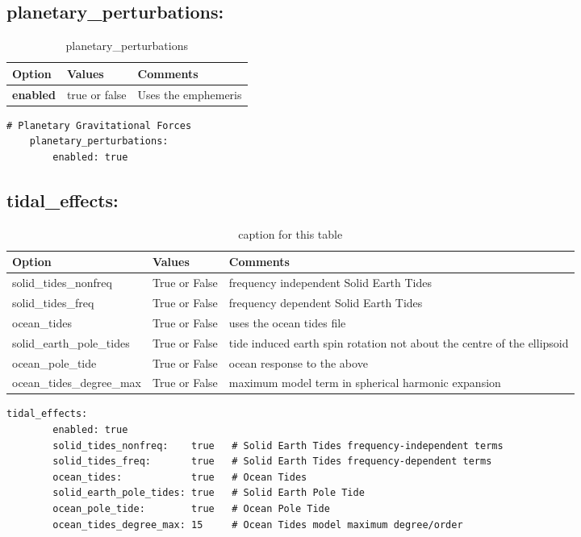 \subsection{planetary\_perturbations:}
\begin{table}[h!]
	\begin{tabular}{|p{4.5cm}|p{2cm}|p{3.5cm}|}
		\hline
		Option & Values & Comments \\
		\hline
		\textbf{enabled} & true or false & Uses the emphemeris \\ %
		\hline
	\end{tabular}
	\caption{planetary\_perturbations}
	\label{table:label_name}
\end{table}  
%
{\small
	\begin{lstlisting}[language=xml,caption=yaml example for planetary pertubations]
# Planetary Gravitational Forces
	planetary_perturbations:
		enabled: true	
	\end{lstlisting}
}	
\subsection{tidal\_effects:}
\begin{table}[h!]
	\begin{tabular}{|p{4.5cm}|p{2cm}|p{3.5cm}|}
		\hline
		Option & Values & Comments \\
		\hline
		solid\_tides\_nonfreq & True or False & frequency independent Solid Earth Tides \\
		solid\_tides\_freq & True or False & frequency dependent Solid Earth Tides \\
		ocean\_tides & True or False & uses the ocean tides file \\
		solid\_earth\_pole\_tides & True or False & tide induced earth spin rotation not about the centre of the ellipsoid \\
		ocean\_pole\_tide & True or False & ocean response to the above \\
		ocean\_tides\_degree\_max & True or False & maximum model term in spherical harmonic expansion \\
		\hline
	\end{tabular}
	\caption{caption for this table}
	\label{table:label_name}
\end{table}
%
{\small
	\begin{lstlisting}[language=xml,caption=yaml example for tidal effects]
   	tidal_effects:
		enabled: true
		solid_tides_nonfreq:    true   # Solid Earth Tides frequency-independent terms
		solid_tides_freq:       true   # Solid Earth Tides frequency-dependent terms
		ocean_tides:            true   # Ocean Tides
		solid_earth_pole_tides: true   # Solid Earth Pole Tide
		ocean_pole_tide:        true   # Ocean Pole Tide
		ocean_tides_degree_max: 15     # Ocean Tides model maximum degree/order	
	\end{lstlisting}
}	
